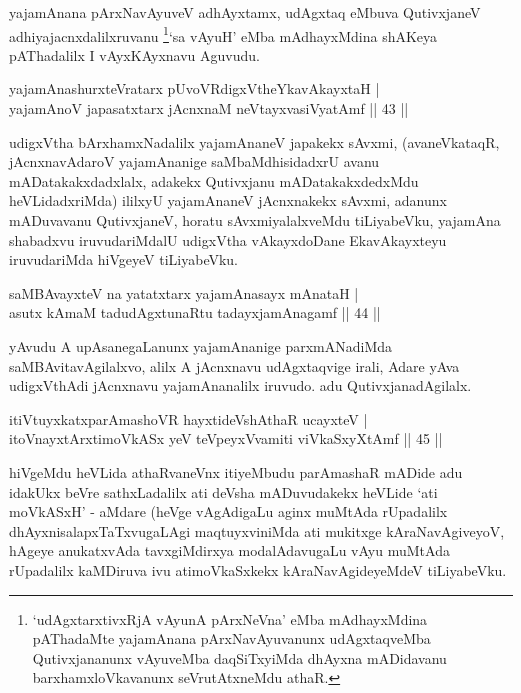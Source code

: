 \begin{artha}
yajamAnana pArxNavAyuveV adhAyxtamx, udAgxtaq eMbuva QutivxjaneV adhiyajacnxdalilxruvanu \footnote[1]{`udAgxtarxtivxRjA vAyunA pArxNeVna' eMba mAdhayxMdina pAThadaMte yajamAnana pArxNavAyuvanunx udAgxtaqveMba Qutivxjananunx vAyuveMba daqSiTxyiMda dhAyxna mADidavanu barxhamxloVkavanunx seVrutAtxneMdu athaR.}`sa vAyuH' eMba mAdhayxMdina shAKeya pAThadalilx I vAyxKAyxnavu Aguvudu.
\end{artha}


\begin{shl}
yajamAnashurxteVratarx pUvoVRdigxVtheYkavAkayxtaH |\\
yajamAnoV japasatxtarx jAcnxnaM neVtayxvasiVyatAmf \hfill || 43 ||
\end{shl}

\begin{artha}
udigxVtha bArxhamxNadalilx yajamAnaneV japakekx sAvxmi, (avaneVkataqR, \-jAcnxnavAdaroV yajamAnanige saMbaMdhisidadxrU avanu mADatakakxdadxlalx, adakekx Qutivxjanu mADatakakxdedxMdu heVLidadxriMda) ililxyU yajamAnaneV jAcnxnakekx sAvxmi, adanunx mADuvavanu QutivxjaneV, horatu sAvxmiyalalxveMdu tiLiyabeVku, yajamAna shabadxvu iruvudariMdalU udigxVtha vAkayxdoDane EkavAkayxteyu iruvudariMda hiVgeyeV tiLiyabeVku.
\end{artha}

\begin{shl}
saMBAvayxteV na yatatxtarx yajamAnasayx mAnataH |\\
asutx kAmaM tadudAgxtunaRtu tadayxjamAnagamf \hfill || 44 ||
\end{shl}

\begin{artha}
yAvudu A upAsanegaLanunx yajamAnanige parxmANadiMda saMBAvita\-vAgilalxvo, alilx A jAcnxnavu udAgxtaqvige irali, Adare yAva udigxVthAdi jAcnxnavu yajamAnanalilx iruvudo. adu QutivxjanadAgilalx.
\end{artha}

\begin{shl}
itiVtuyxkatxparAmashoVR hayxtideVshAthaR ucayxteV |\\
itoV\s nayxtArxtimoVkASx yeV teV\s peyxVvamiti viVkaSxyXtAmf \hfill || 45 ||
\end{shl}

\begin{artha}
hiVgeMdu heVLida athaRvaneVnx itiyeMbudu parAmashaR mADide adu idakUkx beVre sathxLadalilx ati deVsha mADuvudakekx heVLide `ati moVkASxH' - aMdare (heVge vAgAdigaLu aginx muMtAda rUpadalilx dhAyxnisalapxTaTxvugaLAgi maqtuyxviniMda ati mukitxge kAraNavAgiveyoV, hAgeye anukatxvAda tavxgiMdirxya modalAdavugaLu vAyu muMtAda rUpadalilx kaMDiruva ivu atimoVkaSxkekx kAraNavAgideyeMdeV tiLiyabeVku.
\end{artha}

